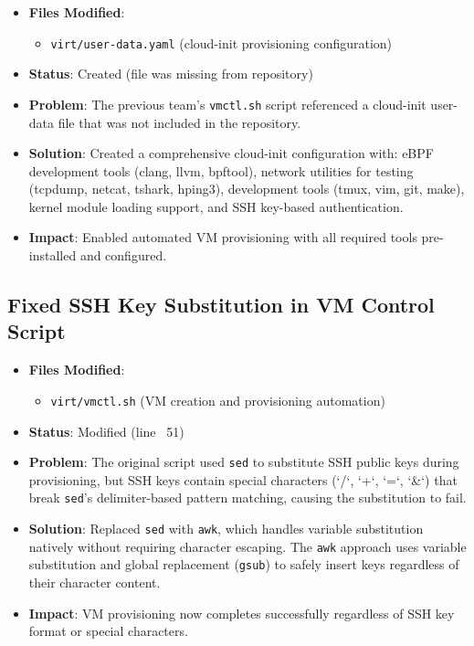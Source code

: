 \begin{itemize}
\item \textbf{Files Modified}:
\begin{itemize}
  \item \texttt{virt/user-data.yaml} (cloud-init provisioning configuration)
\end{itemize}

\item \textbf{Status}: Created (file was missing from repository)

\item \textbf{Problem}: The previous team's \texttt{vmctl.sh} script referenced a cloud-init user-data file that was not included in the repository.

\item \textbf{Solution}: Created a comprehensive cloud-init configuration with: eBPF development tools (clang, llvm, bpftool), network utilities for testing (tcpdump, netcat, tshark, hping3), development tools (tmux, vim, git, make), kernel module loading support, and SSH key-based authentication.

\item \textbf{Impact}: Enabled automated VM provisioning with all required tools pre-installed and configured.
\end{itemize}

\subsection{Fixed SSH Key Substitution in VM Control Script}

\begin{itemize}
\item \textbf{Files Modified}:
\begin{itemize}
  \item \texttt{virt/vmctl.sh} (VM creation and provisioning automation)
\end{itemize}

\item \textbf{Status}: Modified (line ~51)

\item \textbf{Problem}: The original script used \texttt{sed} to substitute SSH public keys during provisioning, but SSH keys contain special characters (`/`, `+`, `=`, `\&`) that break \texttt{sed}'s delimiter-based pattern matching, causing the substitution to fail.

\item \textbf{Solution}: Replaced \texttt{sed} with \texttt{awk}, which handles variable substitution natively without requiring character escaping. The \texttt{awk} approach uses variable substitution and global replacement (\texttt{gsub}) to safely insert keys regardless of their character content.

\item \textbf{Impact}: VM provisioning now completes successfully regardless of SSH key format or special characters.
\end{itemize}

